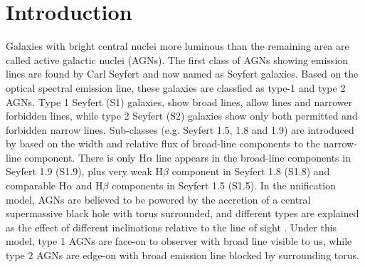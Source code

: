 \documentclass[twocolumn]{aastex63}
\begin{document}

\section{Introduction}\label{sec:intro} 

Galaxies with bright central nuclei more luminous than the remaining area are called active galactic nuclei (AGNs). The first class of AGNs showing emission lines are found by Carl Seyfert and now named as Seyfert galaxies. Based on the optical spectral emission line, these galaxies are classfied as type-1 and type 2 AGNs. Type 1 Seyfert (S1) galaxies, show broad lines, allow lines and narrower forbidden lines, while type 2 Seyfert (S2) galaxies show only both permitted and forbidden narrow lines. Sub-classes (e.g. Seyfert 1.5, 1.8 and 1.9) are introduced by \citet{1976MNRAS.176P..61O,1981ApJ...249..462O} based on the width and relative flux of broad-line components to the narrow-line component. There is only H$\alpha$ line appears in the broad-line components in Seyfert 1.9 (S1.9), plus  
very weak H$\beta$ component in Seyfert 1.8 (S1.8) and comparable H$\alpha$ and H$\beta$ components in Seyfert 1.5 (S1.5). In the unification model, AGNs are believed to be powered by the accretion of a central supermassive black hole with torus surrounded, and different types are explained as the effect of different inclinations relative to the line of sight \citep[see][]{1993ARA&A..31..473A}. Under this model, type 1 AGNs are face-on to observer with broad line visible to us, while type 2 AGNs are edge-on with broad emission line blocked by surrounding torus.
\end{document}
